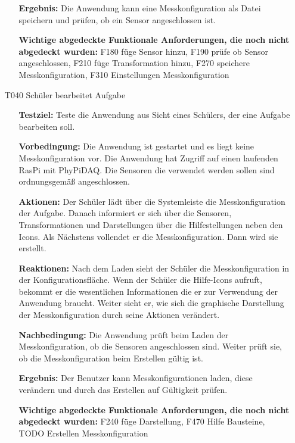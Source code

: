 \documentclass[parskip=full]{scrartcl}
\begin{document}
\begin{itemize}
\begin{itemize}
\item []\textbf{Ergebnis:} Die Anwendung kann eine Messkonfiguration als Datei speichern und prüfen, ob ein Sensor angeschlossen ist.
\item []\textbf{Wichtige abgedeckte Funktionale Anforderungen, die noch nicht abgedeckt wurden:} F180 füge Sensor hinzu, F190 prüfe ob Sensor angeschlossen, F210 füge Transformation hinzu, F270 speichere Messkonfiguration, F310 Einstellungen Messkonfiguration 

\end{itemize}

\item[T040] Schüler bearbeitet Aufgabe
\begin{itemize}

\item []\textbf{Testziel:} Teste die Anwendung aus Sicht eines Schülers, der eine Aufgabe bearbeiten soll.

\item []\textbf{Vorbedingung:} Die Anwendung ist gestartet und es liegt keine Messkonfiguration vor. Die Anwendung hat Zugriff auf einen laufenden \gls{RasPi} mit \gls{PhyPiDAQ}. Die Sensoren die verwendet werden sollen sind ordnungsgemäß angeschlossen.

\item []\textbf{Aktionen:} Der Schüler lädt über die Systemleiste die Messkonfiguration der Aufgabe. Danach informiert er sich über die Sensoren, Transformationen und Darstellungen über die Hilfestellungen neben den Icons. Als Nächstens vollendet er die Messkonfiguration. Dann wird sie erstellt. 
\item []\textbf{Reaktionen:} Nach dem Laden sieht der Schüler die Messkonfiguration in der Konfigurationsfläche. Wenn der Schüler die Hilfe-Icons aufruft, bekommt er die wesentlichen Informationen die er zur Verwendung der Anwendung braucht. Weiter sieht er, wie sich die graphische Darstellung der Messkonfiguration durch seine Aktionen verändert. 
\item []\textbf{Nachbedingung:} Die Anwendung prüft beim Laden der Messkonfiguration, ob die Sensoren angeschlossen sind. Weiter prüft sie, ob die Messkonfiguration beim Erstellen gültig ist. 


\item []\textbf{Ergebnis:} Der Benutzer kann Messkonfigurationen laden, diese verändern und durch das Erstellen auf Gültigkeit prüfen. 
\item []\textbf{Wichtige abgedeckte Funktionale Anforderungen, die noch nicht abgedeckt wurden:} F240 füge Darstellung, F470 Hilfe Bausteine, TODO Erstellen Messkonfiguration


\end{itemize}
\end{itemize}
\end{document}
